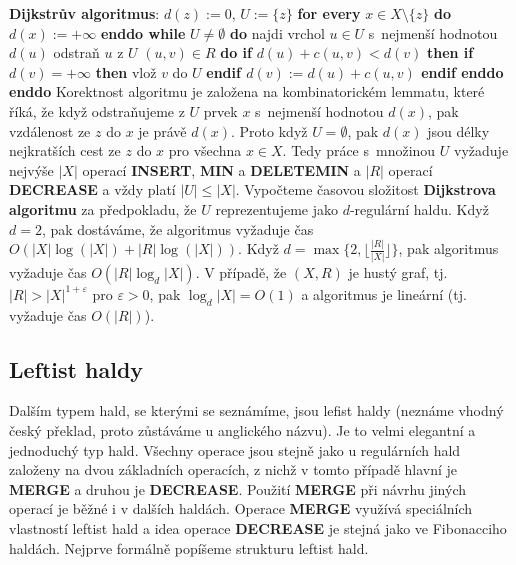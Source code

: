 \documentclass[a4paper,12pt]{article}
\begin{document}
{\bf Dijkstrův algoritmus}:\newline 
$d(z):=0$, $U:=\{z\}$\newline 
{\bf for every} $x\in X\setminus \{z\}$ {\bf do} $d(x):=+\infty$ {\bf enddo\newline 
while} $U\ne\emptyset$ {\bf do\newline 
\phantom{{\rm ---}}}najdi vrchol $u\in U$ s~nejmenší hodnotou $
d(u)$\newline 
\phantom{---}odstraň $u$ z $U$\newline 
\phantom{---}{\bf for every} $(u,v)\in R$ {\bf do \newline 
\phantom{{\rm ------}}if} $d(u)+c(u,v)<d(v)$ {\bf then\newline 
\phantom{{\rm ---------}}if} $d(v)=+\infty$ {\bf then} vlož $v$ do $
U$ {\bf endif\newline 
\phantom{{\rm ---------}}$d(v):=d(u)+c(u,v)$\newline 
\phantom{{\rm ------}}endif\newline 
\phantom{{\rm ---}}enddo\newline 
enddo
}
Korektnost algoritmu je založena na kombinatorickém 
lemmatu, které říká, že když odstra\-ňuje\-me z $
U$ prvek $x$ s~nejmenší hodnotou $d(x)$, pak vzdálenost ze $z$ do $x$ je právě 
$d(x)$. Proto když $U=\emptyset$, pak $d(x)$ jsou délky nejkratších cest ze 
$z$ do $x$ pro všechna $x\in X$. Tedy práce s~množinou $U$ vyžaduje 
nejvýše $|X|$ operací {\bf INSERT}, {\bf MIN} a {\bf DELETEMIN} a $
|R|$ operací 
{\bf DECREASE} a vždy platí $|U|\le |X|$. Vypočteme časovou složitost 
{\bf Dijkstrova algoritmu} za předpokladu, že $U$ reprezentujeme jako $
d$-regulární 
haldu. Když $d=2$, pak dostáváme, že algoritmus vyžaduje čas 
$O(|X|\log(|X|)+|R|\log(|X|))$. Když $d=\max\{2,\lfloor\frac {
|R|}{|X|}\rfloor \}$, pak algoritmus 
vyžaduje čas $O(|R|\log_d|X|)$. V případě, že $
(X,R)$ je hustý graf, 
tj. $|R|>|X|^{1+\varepsilon}$ pro $\varepsilon >0$, pak $\log_d|X
|=O(1)$ a algoritmus 
je lineární (tj. vyžaduje čas $O(|R|)$).

 
\subsection{{Leftist haldy}}

Dalším typem hald, se kterými se seznámíme, jsou lefist 
haldy (neznáme vhodný český překlad, proto zůstáváme 
u anglického názvu). Je to velmi elegantní a jednoduchý typ 
hald. Všechny operace jsou stejně jako u regulárních hald 
založeny na 
dvou základních operacích, z nichž v tomto případě hlavní je {\bf MERGE} a  
druhou je {\bf DECREASE}. Použití {\bf MERGE }
při návrhu jiných operací je běžné i v dalších haldách. 
Operace {\bf MERGE} využívá speciálních vlastností leftist 
hald a idea operace {\bf DECREASE} je stejná jako ve 
Fibonacciho haldách. Nejprve formálně popíšeme strukturu 
leftist hald. 
\end{document}

